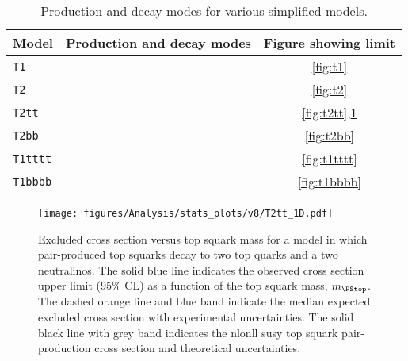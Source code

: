 \begin{table}[h!]
  \caption{Production and decay modes for various simplified models.}
  \label{tab:sms}
  \centering
  \footnotesize
  \begin{tabular}{ llc }
    \hline
    Model & Production and decay modes & Figure showing limit \\ [0.5ex]
    \hline
    \texttt{T1} & \HepProcess{\PSgluino\PSgluino\to\Pquark\APquark\PSneutralino\Pquark\APquark\PSneutralino} & \ref{fig:t1} \\
    \texttt{T2} & \HepProcess{\Psquark\Psquark\to\Pquark\PSneutralino\APquark\PSneutralino} & \ref{fig:t2} \\
    \texttt{T2tt} & \HepProcess{\PStop\PStop\to\Ptop\PSneutralino\APtop\PSneutralino} & \ref{fig:t2tt},\ref{fig:t2tt-mlsp50} \\
    \texttt{T2bb} & \HepProcess{\PSbottom\PSbottom\to\Pbottom\PSneutralino\APbottom\PSneutralino} & \ref{fig:t2bb} \\
    \texttt{T1tttt} & \HepProcess{\PSgluino\PSgluino\to\Ptop\APtop\PSneutralino\Ptop\APtop\PSneutralino} & \ref{fig:t1tttt} \\
    \texttt{T1bbbb} & \HepProcess{\PSgluino\PSgluino\to\Pbottom\APbottom\PSneutralino\Pbottom\APbottom\PSneutralino} & \ref{fig:t1bbbb} \\
    \hline
  \end{tabular}
\end{table}


\begin{figure}[t!]
  \begin{center}
    \texttt{[image: figures/Analysis/stats\_plots/v8/T2tt\_1D.pdf]}
    \caption{\label{fig:t2tt-mlsp50} Excluded cross section versus top
      squark mass for a model in which pair-produced top squarks decay
      to two top quarks and a two neutralinos. The solid blue line
      indicates the observed cross section upper limit (95\% CL) as a
      function of the top squark mass, $m_{\PStop}$. The dashed orange
      line and blue band indicate the median expected excluded cross
      section with experimental uncertainties. The solid black line
      with grey band indicates the \ac{nlonll} \ac{susy} top squark
      pair-production cross section and theoretical uncertainties.}
  \end{center}
\end{figure}


